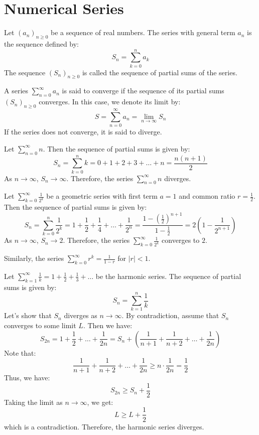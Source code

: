 \chapter{Numerical Series}

\begin{definition}[Series]
    Let $(a_n)_{n\geq 0}$ be a sequence of real numbers. The series with general term $a_n$ is the sequence defined by:
    \[
        S_n = \sum_{k=0}^n a_k
    \]
    The sequence $(S_n)_{n\geq 0}$ is called the sequence of partial sums of the series.
\end{definition}

\begin{definition}
    A series $\sum_{n=0}^{\infty} a_n$ is said to converge if the sequence of its partial sums $(S_n)_{n\geq 0}$ converges. In this case, we denote its limit by:
    \[
        S = \sum_{n=0}^{\infty} a_n = \lim_{n \to \infty} S_n
    \]
    If the series does not converge, it is said to diverge.
\end{definition}

\begin{eg}
    Let $\sum_{n = 0}^{\infty} n$. Then the sequence of partial sums is given by:
    \[
        S_n = \sum_{k=0}^n k = 0 + 1 + 2 + 3 + \ldots + n = \frac{n(n+1)}{2}
    \]
    As $n \to \infty$, $S_n \to \infty$. Therefore, the series $\sum_{n=0}^{\infty} n$ diverges.
\end{eg}
\begin{eg}
    Let $\sum_{k = 0}^{\infty} \frac{1}{2^k}$ be a geometric series with first term $a = 1$ and common ratio $r = \frac{1}{2}$. Then the sequence of partial sums is given by:
    \[
        S_n = \sum_{k=0}^n \frac{1}{2^k} = 1 + \frac{1}{2} + \frac{1}{4} + \ldots + \frac{1}{2^n} = \frac{1 - \left(\frac{1}{2}\right)^{n+1}}{1 - \frac{1}{2}} = 2\left(1 - \frac{1}{2^{n+1}}\right)
    \]
    As $n \to \infty$, $S_n \to 2$. Therefore, the series $\sum_{k = 0}^{\infty} \frac{1}{2^k}$ converges to $2$.
\end{eg}
Similarly, the series $\sum_{k = 0}^{\infty} r^k = \frac{1}{1 - r}$ for $|r| < 1$.
\begin{eg}
    Let $\sum_{k = 1}^{\infty} \frac{1}{k} = 1 + \frac{1}{2} + \frac{1}{3} + \ldots$ be the harmonic series. The sequence of partial sums is given by:
    \[
        S_n = \sum_{k=1}^n \frac{1}{k}
    \]
    Let's show that $S_n$ diverges as $n \to \infty$. By contradiction, assume that $S_n$ converges to some limit $L$. Then we have:
    \[
        S_{2n} = 1 + \frac{1}{2} + \ldots + \frac{1}{2n} = S_n + \left(\frac{1}{n+1} + \frac{1}{n+2} + \ldots + \frac{1}{2n}\right)
    \]
    Note that:
    \[
        \frac{1}{n+1} + \frac{1}{n+2} + \ldots + \frac{1}{2n} \geq n \cdot \frac{1}{2n} = \frac{1}{2}
    \]
    Thus, we have:
    \[
        S_{2n} \geq S_n + \frac{1}{2}
    \]
    Taking the limit as $n \to \infty$, we get:
    \[
        L \geq L + \frac{1}{2}
    \]
    which is a contradiction. Therefore, the harmonic series diverges.
\end{eg}